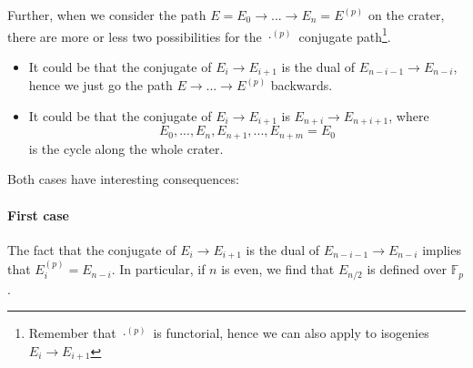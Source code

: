 \documentclass{scrartcl}
\newcommand{\F}{\mathbb{F}}
\theoremstyle{definition}
\begin{document}
Further, when we consider the path $E = E_0 \to ... \to E_n = E^{(p)}$ on the crater, there are more or less two possibilities for the $\cdot^{(p)}$ conjugate path\footnote{Remember that $\cdot^{(p)}$ is functorial, hence we can also apply to isogenies $E_i \to E_{i + 1}$}.
\begin{itemize}
    \item It could be that the conjugate of $E_i \to E_{i + 1}$ is the dual of $E_{n - i - 1} \to E_{n - i}$, hence we just go the path $E \to ... \to E^{(p)}$ backwards.
    \item It could be that the conjugate of $E_i \to E_{i + 1}$ is $E_{n + i} \to E_{n + i + 1}$, where
    \begin{equation*}
        E_0, ..., E_n, E_{n + 1}, ..., E_{n + m} = E_0
    \end{equation*}
    is the cycle along the whole crater.
\end{itemize}
Both cases have interesting consequences:

\paragraph*{First case} The fact that the conjugate of $E_i \to E_{i + 1}$ is the dual of $E_{n - i - 1} \to E_{n - i}$ implies that $E_i^{(p)} = E_{n - i}$.
In particular, if $n$ is even, we find that $E_{n/2}$ is defined over $\F_p$.
\end{document}
